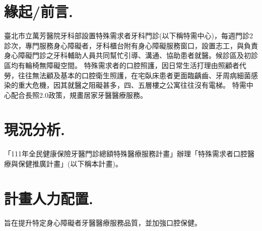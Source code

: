 




\section*{緣起/前言.}
臺北市立萬芳醫院牙科部設置特殊需求者牙科門診(以下稱特需中心)，每週門診2診次，專門服務身心障礙者，牙科櫃台附有身心障礙服務窗口，設置志工，與負責身心障礙門診之牙科輔助人員共同幫忙引導、溝通、協助患者就醫。候診區及初診區均有輪椅無障礙空間。
特殊需求者的口腔照護，因日常生活打理由照顧者代勞，往往無法顧及基本的口腔衛生照護，在宅臥床患者更面臨齲齒、牙周病細菌感染的重大危機，因其就醫之阻礙甚多，四、五層樓之公寓往往沒有電梯。
特需中心配合長照2.0政策，規畫居家牙醫醫療服務。

\section*{現況分析.}
「111年全民健康保險牙醫門診總額特殊醫療服務計畫」辦理「特殊需求者口腔醫療與保健推廣計畫」(以下稱本計畫)。

\section*{計畫人力配置.} 旨在提升特定身心障礙者牙醫醫療服務品質，並加強口腔保健。

